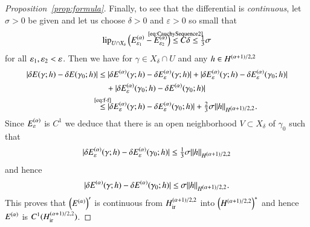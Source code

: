 \begin{proof}[Proposition~\ref{prop:formula}]
Finally, to see that the differential is \emph{continuous}, let $\sigma >0$ be given and let us choose
$\delta>0$ and $\varepsilon>0$ so small that
\begin{equation*}
 \lip_{U\cap X_\delta}\br{\Ee[\eps_1]-\Ee[\eps_2]} \refeq[\le]{CauchySequence2} C \delta \leq \tfrac13 \sigma
\end{equation*}
for all $\varepsilon_1, \varepsilon_2 < \varepsilon$. Then we
have for $\gamma \in X_\delta \cap U$ and any $h\in H^{\scriptstyle (\alpha+1)/2,2}$
\begin{align*}
 |\delta E(\gamma;h) - \delta E(\gamma_0;h)|
 &\leq |\delta \E(\gamma;h) - \delta \Ee(\gamma;h)| + 
  |\delta \Ee(\gamma;h) - \delta \Ee(\gamma_0;h)| 
 \\ 
  &\quad + |\delta \Ee(\gamma_0;h) - \delta \E(\gamma_0;h)|
 \\
  &\refeq[\le]{f-f}  |\delta \Ee(\gamma;h) - \delta \Ee(\gamma_0;h)| +  \tfrac23 \sigma \|h\|_{\W}.
\end{align*} 
Since $E_{\varepsilon}^{(\alpha)}$ is $C^1$ we deduce that there is an open neighborhood $V\subset X_\delta$
of $\gamma_0$ such that 
\begin{equation*}
 |\delta E_{\varepsilon}^{(\alpha)}(\gamma;h) - \delta E_{\varepsilon}^{(\alpha)}(\gamma_0;h)| \leq \tfrac13\sigma \|h\|_{H^{\scriptstyle (\alpha+1)/2,2}}
\end{equation*}
and hence
\begin{equation*}
  |\delta E^{(\alpha)}(\gamma;h) - \delta E^{(\alpha)}(\gamma_0;h)| \leq \sigma \|h\|_{H^{\scriptstyle (\alpha+1)/2,2}}.
\end{equation*}
This proves that $\left(E^{(\alpha)} \right)'$ is continuous from $H_{\mathrm{ir}}^{(\alpha+1)/2,2}$ into $\left( H^{\scriptstyle (\alpha+1)/2,2} \right)^\ast$ and
hence $E^{(\alpha)}$ is $C^1(H_{\mathrm{ir}}^{(\alpha+1)/2,2})$.
\end{proof}


